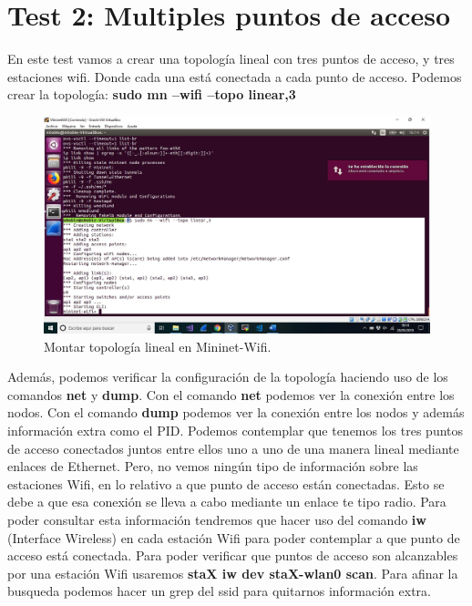 \section{Test 2: Multiples puntos de acceso}
En este test vamos a crear una topología lineal con tres puntos de acceso, y tres estaciones wifi. Donde cada una está conectada a cada punto de acceso.\newline
\newline
Podemos crear la topología: \textbf{sudo mn --wifi --topo linear,3}
\newpage
\begin{figure}[!htb]
  \centering
    \includegraphics[width=\linewidth]{./img/9.JPG}
    \caption{Montar topología lineal en Mininet-Wifi.}
  \label{fig:yo}
\end{figure}
Además,  podemos  verificar la configuración de la topología haciendo uso de los comandos \textbf{net} y \textbf{dump}. Con el comando \textbf{net} podemos ver la conexión entre los nodos. Con el comando \textbf{dump} podemos ver la conexión entre los nodos y además información extra como el PID.\newline
\newline
Podemos contemplar que tenemos los tres puntos de acceso conectados juntos entre ellos uno a uno de una manera lineal mediante enlaces de Ethernet. Pero, no vemos ningún tipo de información sobre las estaciones Wifi, en lo relativo a que punto de acceso están conectadas. Esto se debe a que esa conexión se lleva a cabo mediante un enlace te tipo radio. Para poder consultar esta información tendremos que hacer uso del comando \textbf{iw} (Interface Wireless) en cada estación Wifi para poder contemplar a que punto de acceso está conectada. \newline
\newline
Para poder verificar que puntos de acceso son alcanzables por una estación Wifi usaremos \textbf{staX iw dev staX-wlan0 scan}. Para afinar la busqueda podemos hacer un grep del ssid para quitarnos información extra.\newline
